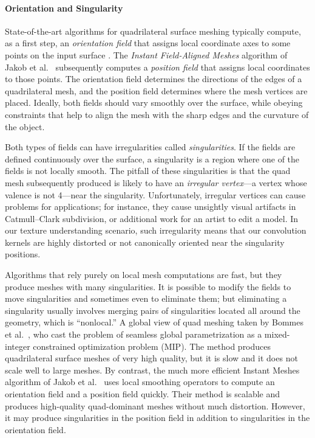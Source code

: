 \paragraph*{Orientation and Singularity} State-of-the-art algorithms for quadrilateral surface meshing typically compute, as a first step, an \emph{orientation field} that assigns local coordinate axes to some points on the input surface \cite{knupp1995mesh,ray2006periodic,kalberer2007quadcover,bommes2009mixed}. The {\em Instant Field-Aligned Meshes} \mbox{algorithm} of Jakob et al.~\cite{jakob2015instant} subsequently computes a \emph{position field} that assigns local coordinates %
to those points. The orientation field determines the directions of the edges of a quadrilateral mesh, and the position field determines where the mesh vertices are placed. Ideally, both fields should vary smoothly over the surface, while obeying constraints that help to align the mesh with the sharp edges and the curvature of the object.

Both types of fields can have irregularities called \emph{singularities}. If the fields are defined continuously over the surface, a singularity is a region where one of the fields is not locally smooth.
The pitfall of these singularities is that the quad mesh subsequently produced is likely to have an \emph{irregular vertex}---a vertex whose valence is not 4---near the singularity. 
Unfortunately, irregular vertices can cause problems for applications; for instance, they cause unsightly visual artifacts in Catmull--Clark subdivision, or additional work for an artist to edit a model. In our texture understanding scenario, such irregularity means that our convolution kernels are highly distorted or not canonically oriented near the singularity positions.

Algorithms that rely purely on local mesh computations are fast, but they produce meshes with many singularities. It is possible to modify the fields to move singularities and sometimes even to eliminate them; but eliminating a singularity
usually involves merging pairs of singularities located all around the geometry, which is ``nonlocal.'' 
A global view of quad meshing taken by Bommes et al.~\cite{bommes2009mixed}, who cast the problem of seamless global parametrization as a mixed-integer constrained optimization problem (MIP).
The method produces quadrilateral surface meshes of very high quality, but it is slow and it does not scale well to large meshes. By contrast, the much more efficient Instant Meshes algorithm of Jakob et al.~\cite{jakob2015instant} uses local smoothing operators to compute an orientation field and a position field quickly. Their method is scalable and produces high-quality quad-dominant meshes without much distortion. However, it may produce singularities in the position field in addition to singularities in the orientation field.

